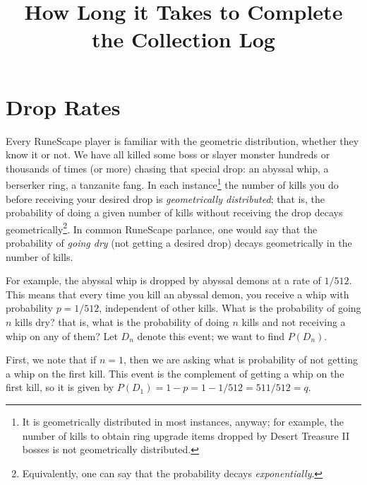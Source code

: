 \documentclass[letterpaper]{article}
\title{How Long it Takes to Complete the Collection Log}
\begin{document}
\maketitle
	
\section{Drop Rates}
	Every RuneScape player is familiar with the geometric distribution, whether they know it or not. We have all killed some boss or slayer monster hundreds or thousands of times (or more) chasing that special drop: an abyssal whip, a berserker ring, a tanzanite fang. In each instance\footnote{It is geometrically distributed in most instances, anyway; for example, the number of kills to obtain ring upgrade items dropped by Desert Treasure II bosses is not geometrically distributed.} the number of kills you do before receiving your desired drop is \textit{geometrically distributed}; that is, the probability of doing a given number of kills without receiving the drop decays geometrically\footnote{Equivalently, one can say that the probability decays \textit{exponentially}.}. In common RuneScape parlance, one would say that the probability of \textit{going dry} (not getting a desired drop) decays geometrically in the number of kills.
	
	For example, the abyssal whip is dropped by abyssal demons at a rate of $1/512$. This means that every time you kill an abyssal demon, you receive a whip with probability $p = 1/512$, independent of other kills. What is the probability of going $n$ kills dry? that is, what is the probability of doing $n$ kills and not receiving a whip on any of them? Let $D_n$ denote this event; we want to find $P(D_n)$.
	
	First, we note that if $n=1$, then we are asking what is probability of not getting a whip on the first kill. This event is the complement of getting a whip on the first kill, so it is given by $P(D_1) = 1 - p= 1-1/512 = 511/512 = q$.
	
\end{document}

